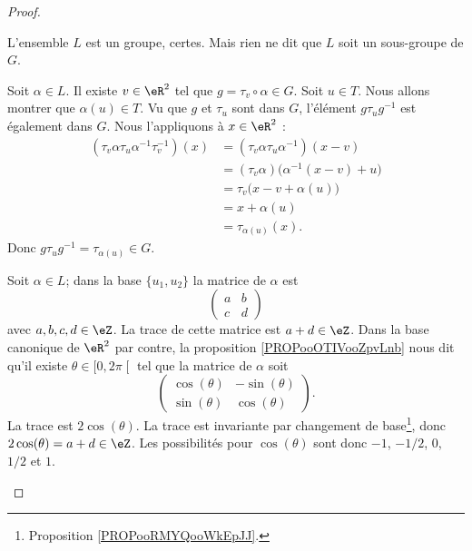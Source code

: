 \begin{proof}
\begin{subproof}
		\spitem[Précision]
		L'ensemble \( L\) est un groupe, certes. Mais rien ne dit que \( L\) soit un sous-groupe de \( G\).

		Soit \( \alpha\in L\). Il existe \( v\in \eR^2\) tel que \( g=\tau_v\circ \alpha\in G\). Soit \( u\in T\). Nous allons montrer que \( \alpha(u)\in T\). Vu que \( g\) et \( \tau_u\) sont dans \( G\), l'élément \( g\tau_ug^{-1}\) est également dans \( G\). Nous l'appliquons à \( x\in \eR^2\) :
		\begin{subequations}
			\begin{align}
				(\tau_v\alpha\tau_u\alpha^{-1}\tau_v^{-1})(x) & =(\tau_v\alpha\tau_u\alpha^{-1})(x-v)            \\
				                                              & =(\tau_v\alpha)\big( \alpha^{-1}(x-v)+u \big)    \\
				                                              & =\tau_v\big( x-v+\alpha(u) \big)                 \\
				                                              & =x+\alpha(u)                                     \\
				                                              & =\tau_{\alpha(u)}(x).
			\end{align}
		\end{subequations}
		Donc \( g\tau_ug^{-1}=\tau_{\alpha(u)}\in G\).

		Soit \( \alpha\in L\); dans la base \( \{ u_1,u_2 \}\) la matrice de \( \alpha\) est
		\begin{equation}
			\begin{pmatrix}
				a & b \\
				c & d
			\end{pmatrix}
		\end{equation}
		avec \( a,b,c,d\in \eZ\). La trace de cette matrice est \( a+d\in \eZ\). Dans la base canonique de \( \eR^2\) par contre, la proposition \ref{PROPooOTIVooZpvLnb} nous dit qu'il existe \( \theta\in \mathopen[ 0 , 2\pi \mathclose[\) tel que la matrice de \( \alpha\) soit
		\begin{equation}
			\begin{pmatrix}
				\cos(\theta) & -\sin(\theta) \\
				\sin(\theta) & \cos(\theta)
			\end{pmatrix}.
		\end{equation}
		La trace est \( 2\cos(\theta)\). La trace est invariante par changement de base\footnote{Proposition \ref{PROPooRMYQooWkEpJJ}.}, donc \( 2\cos(\theta)=a+d\in \eZ\). Les possibilités pour \( \cos(\theta)\) sont donc \( -1\), \( -1/2\), \( 0\), \( 1/2\) et \( 1\).


\end{subproof}
\end{proof}
